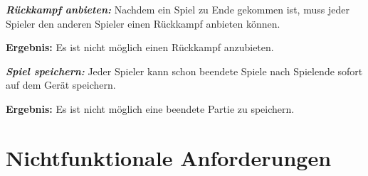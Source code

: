 \documentclass[parskip=full]{scrartcl}
\begin{document}
\begin{description}
	\item[F3070] \textbf{\textit{Rückkampf anbieten: }} Nachdem ein Spiel zu Ende gekommen ist, muss jeder Spieler den anderen Spieler einen Rückkampf anbieten können.	
	\item \textbf{Ergebnis: } Es ist nicht möglich einen Rückkampf anzubieten.
		
	\item[F3080] \textbf{\textit{Spiel speichern: }}  Jeder Spieler kann schon beendete Spiele nach Spielende sofort auf dem Gerät speichern. 
	\item \textbf{Ergebnis: } Es ist nicht möglich eine beendete Partie zu speichern.
	
\end{description}
	\section{Nichtfunktionale Anforderungen}
\end{document}
